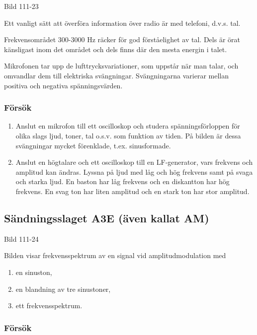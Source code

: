 Bild 111-23

Ett vanligt sätt att överföra information över radio är med telefoni, d.v.s. tal.

Frekvensområdet 300-3000 Hz räcker för god förståelighet av tal. Dels är örat känsligast
inom det området och dels finns där den mesta energin i talet.

Mikrofonen tar upp de lufttrycksvariationer, som uppstår när man talar, och omvandlar dem
till elektriska svängningar. Svängningarna varierar mellan positiva och negativa
spänningsvärden.

\subsubsection{Försök}

\begin{enumerate}
\item Anslut en mikrofon till ett oscilloskop och studera spänningsförloppen för olika slags
ljud, toner, tal o.s.v. som funktion av tiden. På bilden är dessa svängningar mycket
förenklade, t.ex. sinusformade.

\item Anslut en högtalare och ett oscilloskop till en LF-generator, vars frekvens och amplitud
kan ändras. Lyssna på ljud med låg och hög frekvens samt på svaga och starka ljud. En
baston har låg frekvens och en diskantton har hög frekvens. En svag ton har liten
amplitud och en stark ton har stor amplitud.
\end{enumerate}

\subsection{Sändningsslaget A3E (även kallat AM)}

Bild 111-24

Bilden visar frekvensspektrum av en signal vid amplitudmodulation med

\begin{enumerate}[label=\alph*.,noitemsep]
\item en sinuston,
\item en blandning av tre sinustoner,
\item ett frekvensspektrum.
\end{enumerate}

\subsubsection{Försök}

